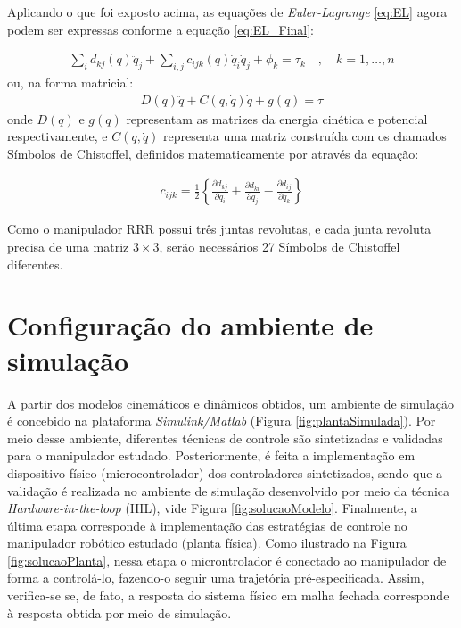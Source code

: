Aplicando o que foi exposto acima, as equações de \textit{Euler-Lagrange} 
\ref{eq:EL} agora podem ser expressas conforme a equação \ref{eq:EL_Final}:

\begin{equation}
  \begin{gathered}
    \sum_i d_{kj}(q)\ddot q_j + \sum_{i,j}c_{ijk}(q)\dot q_i\dot q_j + \phi_k = \tau_k \quad, \quad k=1,\dots,n
  \end{gathered}
  \label{eq:EL_Final}
\end{equation}
ou, na forma matricial:
\begin{equation}
  \begin{gathered}
    D(q)\ddot q + C(q,\dot q)\dot q + g(q) = \tau
  \end{gathered}
  \label{eq:EL_FinalMat}
\end{equation}
onde $D(q)$ e $g(q)$ representam as matrizes da energia cinética e potencial 
respectivamente, e $C(q,\dot q)$ representa uma matriz construída com os chamados
Símbolos de Chistoffel, definidos matematicamente por  através
da equação:

\begin{equation}
  \begin{gathered}
    c_{ijk} = \frac{1}{2} \left\{ \frac{\partial d_{kj}}{\partial q_i}+\frac{\partial d_{ki}}{\partial q_j}-\frac{\partial d_{ij}}{\partial q_k} \right\}
  \end{gathered}
  \label{eq:christoffel}
\end{equation}

Como o manipulador RRR possui três juntas revolutas, e cada junta revoluta precisa de uma matriz 
$3 \times 3$, serão necessários 27 Símbolos de Chistoffel diferentes.

\section{Configuração do ambiente de simulação}

A partir dos modelos cinemáticos e dinâmicos obtidos, um ambiente de simulação é 
concebido na plataforma \textit{Simulink/Matlab} (Figura \ref{fig:plantaSimulada}). Por meio desse 
ambiente, diferentes técnicas de controle são sintetizadas e validadas para o manipulador estudado. 
Posteriormente, é feita a implementação em dispositivo físico (microcontrolador) 
dos controladores sintetizados, sendo que a validação é realizada no ambiente de simulação 
desenvolvido por meio da técnica \textit{Hardware-in-the-loop} (HIL), vide Figura 
\ref{fig:solucaoModelo}. Finalmente, a última etapa corresponde à implementação das 
estratégias de controle no manipulador robótico estudado (planta física). Como ilustrado 
na Figura \ref{fig:solucaoPlanta}, nessa etapa o microntrolador é conectado ao manipulador de 
forma a controlá-lo, fazendo-o seguir uma trajetória pré-especificada. Assim, verifica-se 
se, de fato, a resposta do sistema físico em malha fechada corresponde à resposta obtida 
por meio de simulação.

